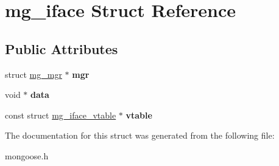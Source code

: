 \hypertarget{structmg__iface}{}\section{mg\+\_\+iface Struct Reference}
\label{structmg__iface}
\subsection*{Public Attributes}
\begin{DoxyCompactItemize}
\item 
\mbox{\label{structmg__iface_ad25f7c336d2f8f9ae7505412e9c17fc2}} 
struct \hyperlink{structmg__mgr}{mg\+\_\+mgr} $\ast$ {\bfseries mgr}
\item 
\mbox{\label{structmg__iface_a43da8e59cadad694395f2a55df5c32a8}} 
void $\ast$ {\bfseries data}
\item 
\mbox{\label{structmg__iface_ae02adab992b9704f4e61e937c505f336}} 
const struct \hyperlink{structmg__iface__vtable}{mg\+\_\+iface\+\_\+vtable} $\ast$ {\bfseries vtable}
\end{DoxyCompactItemize}


The documentation for this struct was generated from the following file\+:\begin{DoxyCompactItemize}
\item 
mongoose.\+h\end{DoxyCompactItemize}
